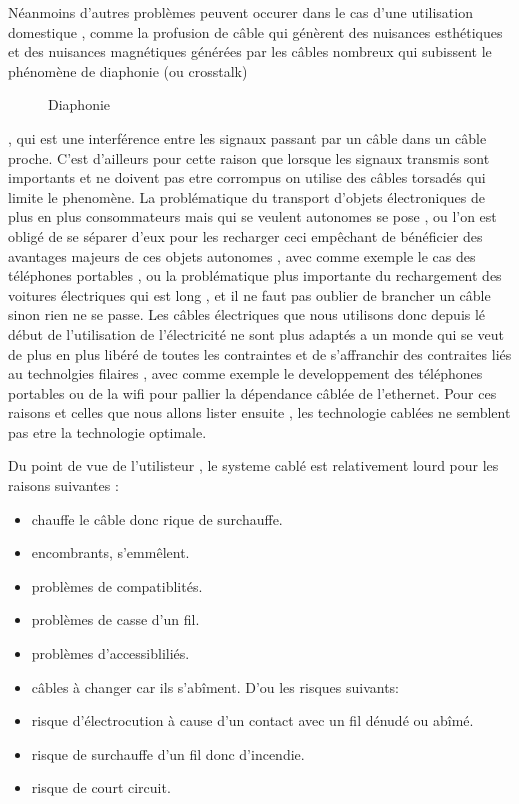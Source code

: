 \documentclass[12pt]{report}
\begin{document}
	Néanmoins d'autres problèmes peuvent occurer dans le cas d'une utilisation domestique , comme la profusion de câble qui génèrent des nuisances esthétiques et des nuisances magnétiques générées par les câbles nombreux qui subissent le phénomène de diaphonie (ou crosstalk)\cite{wiki4}
\begin{figure}
  \begin{center}
    \setlength\fboxsep{0pt}
    \setlength\fboxrule{0.5pt}
  \end{center}
  \caption{Diaphonie}
\end{figure}, qui est une interférence entre les signaux passant par un câble dans un câble proche. C'est d'ailleurs pour cette raison que lorsque les signaux transmis sont importants et ne doivent pas etre corrompus on utilise des câbles torsadés qui limite le phenomène. La problématique du transport d'objets électroniques de plus en plus consommateurs mais qui se veulent autonomes se pose , ou l'on est obligé de se séparer d'eux pour les recharger ceci empêchant de bénéficier des avantages majeurs de ces objets autonomes , avec comme exemple le cas des téléphones portables , ou la problématique plus importante du rechargement des voitures électriques qui est long , et il ne faut pas oublier de brancher un câble sinon rien ne se passe. Les câbles électriques que nous utilisons donc depuis lé  début de l'utilisation de l'électricité ne sont plus adaptés a un monde qui se veut de plus en plus libéré de toutes les contraintes et de s'affranchir des contraites liés au technolgies filaires , avec comme exemple le developpement des téléphones portables ou de la wifi pour pallier la dépendance câblée de l'ethernet. Pour ces raisons et celles que nous allons lister ensuite , les technologie cablées ne semblent pas etre la technologie optimale.

	Du point de vue de l'utilisteur , le systeme cablé est relativement lourd pour les raisons suivantes :
\begin{itemize}
	\item chauffe le câble donc rique de surchauffe.
	\item encombrants, s'emmêlent.
	\item problèmes de compatiblités.
	\item problèmes de casse d'un fil.
	\item problèmes d'accessibliliés.
	\item câbles à changer car ils s'abîment.
	D'ou les risques suivants:
	\item risque d'électrocution à cause d'un contact avec un fil dénudé ou abîmé.
	\item risque de surchauffe d'un fil donc d'incendie.
	\item risque de court circuit.
\end{itemize}
\end{document}
